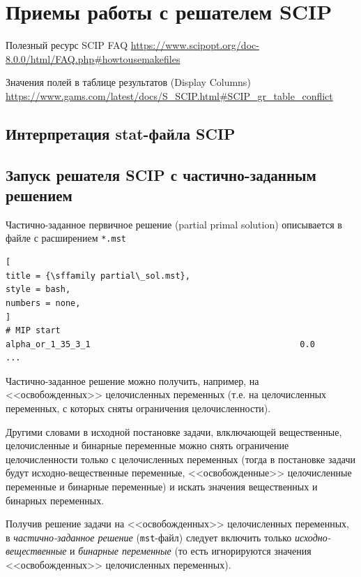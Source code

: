 \documentclass[%
	11pt,
	a4paper,
	utf8,
		]{article}
\begin{document}
\section{Приемы работы с решателем SCIP}

Полезный ресурс SCIP FAQ \url{https://www.scipopt.org/doc-8.0.0/html/FAQ.php#howtousemakefiles}

Значения полей в таблице результатов (Display Columns) \url{https://www.gams.com/latest/docs/S_SCIP.html#SCIP_gr_table_conflict}

\subsection{Интерпретация stat-файла SCIP}



\subsection{Запуск решателя SCIP с частично-заданным решением}

Частично-заданное первичное решение (partial primal solution) описывается в файле с расширением \verb|*.mst|
\begin{lstlisting}[
title = {\sffamily partial\_sol.mst},
style = bash,
numbers = none,
]
# MIP start
alpha_or_1_35_3_1                                          0.0
...
\end{lstlisting}


Частично-заданное решение можно получить, например, на <<освобожденных>> целочисленных переменных (т.е. на целочисленных переменных, с которых сняты ограничения целочисленности).

Другими словами в исходной постановке задачи, влключающей вещественные, целочисленные и бинарные переменные можно снять ограничение целочисленности только с целочисленных переменных (тогда в постановке задачи будут исходно-вещественные переменные, <<освобожденные>> целочисленные переменные и бинарные переменные) и искать значения вещественных и бинарных переменных.

Получив решение задачи на <<освобожденных>> целочисленных переменных, в \emph{частично-заданное решение} (\verb|mst|-файл) следует включить только \emph{исходно-вещественные} и \emph{бинарные переменные} (то есть игнорируются значения <<освобожденных>> целочисленных переменных).
\end{document}
